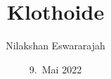 %
%
%


\beamertemplatenavigationsymbolsempty
\title[Klothoide]{Klothoide}
\author[N.~Eswararajah]{Nilakshan Eswararajah}
\date[]{9.~Mai 2022}

